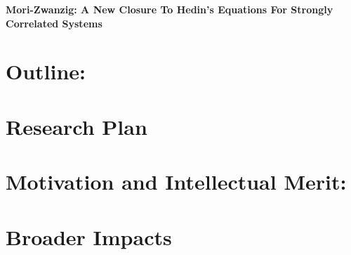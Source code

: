 \documentclass[11pt]{article} %
\begin{document}
\begin{center}
\large{\bf Mori-Zwanzig: A New Closure To Hedin's Equations For Strongly Correlated Systems}
\end{center}

\section*{Outline:}


\section*{Research Plan}


\section*{Motivation and Intellectual Merit:}


\section*{Broader Impacts}



\end{document}
